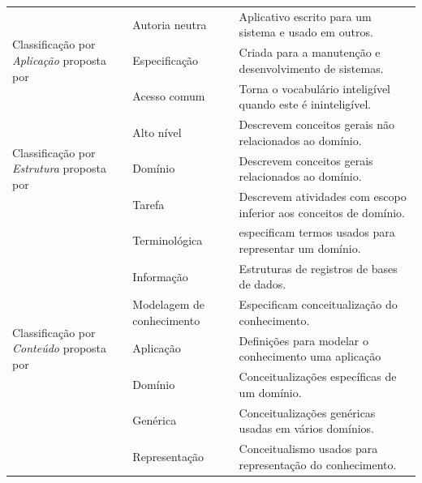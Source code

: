 \begin{table}[htb]
\begin{tabular}{|l|l|l|}
\hline
\multirow{3}{*}{\parbox{3cm}{Classificação por \emph{Aplicação} proposta por }} 	& Autoria neutra        & Aplicativo escrito para um sistema e usado em outros.         \\ [0.1cm]
									                    & Especificação        	& Criada para a manutenção e desenvolvimento de sistemas.   \\  
									                    & Acesso comum          & Torna o vocabulário inteligível quando este é ininteligível.\\
\hline
\multirow{3}{*}{\parbox{2.5cm}{Classificação por \emph{Estrutura} proposta por  }} & Alto nível       & Descrevem conceitos gerais não relacionados ao domínio.         \\ 
	                   						& Domínio          		& Descrevem conceitos gerais relacionados ao domínio. \\ 
	                   						& Tarefa           		& Descrevem atividades com escopo inferior aos conceitos de domínio.  \\ 
\hline  
\multirow{7}{*}{\parbox{3cm}{Classificação por \emph{Conteúdo} proposta por  }} 			& Terminológica     	    & especificam termos usados para representar um domínio.        \\ 
									                    & Informação   		        & Estruturas de registros de bases de dados.         \\ 
									                    & \parbox{2.5cm}{Modelagem de conhecimento} & Especificam conceitualização do conhecimento.         \\
									                    & Aplicação             	& Definições para modelar o conhecimento uma aplicação   \\
									                    & Domínio             		& Conceitualizações específicas de um domínio.  \\ 
									                    & Genérica             		& Conceitualizações genéricas usadas em vários domínios.  \\
									                    & Representação             & Conceitualismo usados para representação do conhecimento.         \\    \hline
\end{tabular}

\label{tabela_classificacao_ontologias}
\vspace{0.1cm}
\end{table}
\egroup

